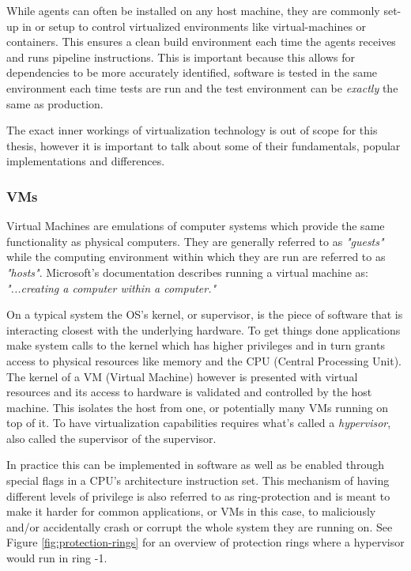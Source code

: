 While agents can often be installed on any host machine, they are commonly set-up in or setup to control virtualized environments like virtual-machines or containers. This ensures a clean build environment each time the agents receives and runs pipeline instructions. This is important because this allows for dependencies to be more accurately identified, software is tested in the same environment each time tests are run and the test environment can be \textit{exactly} the same as production.

The exact inner workings of virtualization technology is out of scope for this thesis, however it is important to talk about some of their fundamentals, popular implementations and differences.

\subsubsection{VMs} \label{subsec:VMs}
Virtual Machines are emulations of computer systems which provide the same functionality as physical computers. They are generally referred to as \textit{"guests"} while the computing environment within which they are run are referred to as \textit{"hosts"}. Microsoft's documentation describes running a virtual machine as: \textit{"...creating a computer within a computer."}\cite{azure-vm} 

On a typical system the OS's kernel, or supervisor, is the piece of software that is interacting closest with the underlying hardware.
To get things done applications make system calls to the kernel which has higher privileges and in turn grants access to physical resources like memory and the CPU (Central Processing Unit). The kernel of a VM (Virtual Machine) however is presented with virtual resources and its access to hardware is validated and controlled by the host machine. This isolates the host from one, or potentially many VMs running on top of it. To have virtualization capabilities requires what's called a \textit{hypervisor}, also called the supervisor of the supervisor.\cite{virt-dummy,what-is-hypervisor} 

\pagebreak

In practice this can be implemented in software as well as be enabled through special flags in a CPU's architecture instruction set.\cite{virtualbox-virt,hardware-virt} This mechanism of having different levels of privilege is also referred to as ring-protection and is meant to make it harder for common applications, or VMs in this case, to maliciously and/or accidentally crash or corrupt the whole system they are running on.\cite{computerphile-virt}  See Figure \ref{fig:protection-rings} for an overview of protection rings where a hypervisor would run in ring -1.

